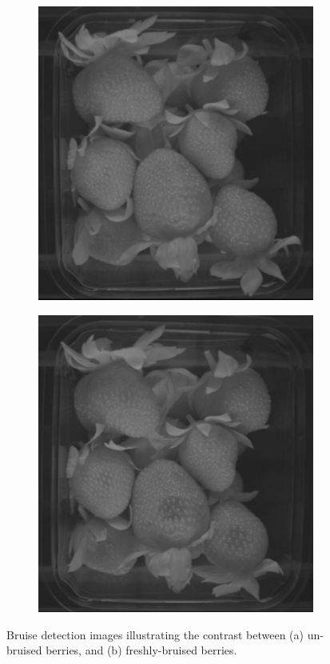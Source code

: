 \documentclass[fleqn,twoside,12pt]{report}
\begin{document}
\begin{figure}[ht]
	\centering
	\begin{subfigure}{.5\textwidth}
		\centering
		\includegraphics[width=.8\linewidth]{bruise_ir_1.jpg}
		\caption{}
		\label{fig:bruise_ir_1}
	\end{subfigure}%
	\begin{subfigure}{.5\textwidth}
		\centering
		\includegraphics[width=.8\linewidth]{bruise_ir_2.jpg}
		\caption{}
		\label{fig:bruise_ir_2}
	\end{subfigure}%
	
	\caption{Bruise detection images illustrating the contrast between (a) un-bruised berries, and (b) freshly-bruised berries.}
	\label{}
\end{figure}
\end{document}
